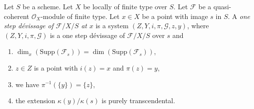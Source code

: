 \begin{definition}
\label{definition-one-step-devissage-at-x}
Let $S$ be a scheme.
Let $X$ be locally of finite type over $S$.
Let $\mathcal{F}$ be a quasi-coherent $\mathcal{O}_X$-module of finite type.
Let $x \in X$ be a point with image $s$ in $S$.
A {\it one step d\'evissage of $\mathcal{F}/X/S$ at $x$}
is a system $(Z, Y, i, \pi, \mathcal{G}, z, y)$, where
$(Z, Y, i, \pi, \mathcal{G})$ is a one step d\'evissage of
$\mathcal{F}/X/S$ over $s$ and
\begin{enumerate}
\item $\dim_x(\text{Supp}(\mathcal{F}_s)) = \dim(\text{Supp}(\mathcal{F}_s))$,
\item $z \in Z$ is a point with $i(z) = x$ and $\pi(z) = y$,
\item we have $\pi^{-1}(\{y\}) = \{z\}$,
\item the extension $\kappa(y)/\kappa(s)$ is purely
transcendental.
\end{enumerate}
\end{definition}